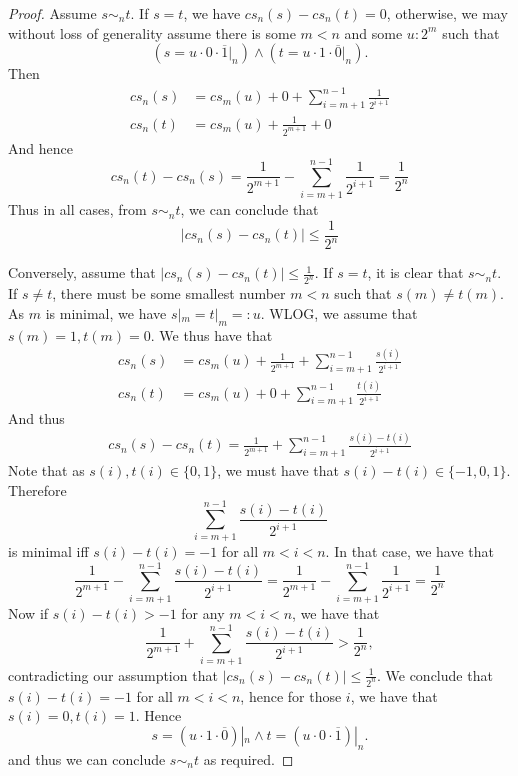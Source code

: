 \begin{proof}
  \item  
    Assume $ s \sim_n t$. If $s=t$, we have $cs_n(s) - cs_n(t) = 0$, 
    otherwise, we may without loss of generality assume there is some $m<n$ and some $u:2^m$ such that 
  \begin{equation}
    (s = u \cdot 0 \cdot \overline 1|_n) \wedge ( t = u \cdot 1 \cdot \overline 0 |_n) . 
  \end{equation}
  Then 
  \begin{align}
    cs_n(s) &= 
    cs_m(u) + 0 + \sum\limits_{i = m+1}^{n-1} \frac{1}{2^{i+1}}\\
    cs_n(t) &= 
    cs_m(u) + \frac{1}{2^{m+1}} + 0  
  \end{align}
  And hence 
  \begin{equation}
    cs_n(t) - cs_n(s) = \frac{1}{2^{m+1}} - \sum\limits_{i = m+1}^{n-1} \frac{1}{2^{i+1}} = \frac{1}{2^n}
  \end{equation}
  Thus in all cases, from $s\sim_n t$, we can conclude that 
  \begin{equation}
    |cs_n(s) -cs_n(t) |\leq \frac{1}{2^n}
  \end{equation}
  \item 
  Conversely, assume that $|cs_n(s) - cs_n(t)| \leq \frac{1}{2^n}$. 
  If $s = t$, it is clear that $s \sim_n t$.
  If $s\neq t$, there must be some smallest number $m<n$ such that 
  $s(m) \neq t(m)$. As $m$ is minimal, we have $s|_m = t|_m = : u$. 
  WLOG, we assume that $s(m) = 1, t(m) = 0$. 
  We thus have that 
  \begin{align}
    cs_n(s) &= 
    cs_m(u) + \frac1{2^{m+1}} + \sum\limits_{i = m+1}^{n-1} \frac{s(i)}{2^{i+1}}\\
    cs_n(t) &= 
    cs_m(u) + 0  + \sum\limits_{i = m+1}^{n-1} \frac{t(i)}{2^{i+1}}
  \end{align}
  And thus 
  \begin{align}
    cs_n(s)-cs_n(t) = \frac{1}{2^{m+1}} + \sum\limits_{i = m+1}^{n-1} \frac{s(i)-t(i)}{2^{i+1}}
  \end{align}
  Note that as $s(i),t(i) \in \{0,1\}$, we must have that $s(i) -t(i) \in \{-1,0,1\}$. 
  Therefore 
  $$\sum\limits_{i = m+1}^{n-1} \frac{s(i)-t(i)}{2^{i+1}}$$
  is minimal iff $s(i) -t(i) = -1$ for all $m<i<n$. 
  In that case, we have that 
  $$
  \frac{1}{2^{m+1}}-
  \sum\limits_{i = m+1}^{n-1} \frac{s(i)-t(i)}{2^{i+1}}= 
  \frac{1}{2^{m+1}}-
  \sum\limits_{i = m+1}^{n-1} \frac{1}{2^{i+1}}= 
  \frac{1}{2^n}
  $$
  Now if $s(i) -t(i) > -1$ for any $m<i<n$, we have that
    $$
    \frac{1}{2^{m+1}} + \sum\limits_{i = m+1}^{n-1} \frac{s(i)-t(i)}{2^{i+1}}> \frac{1}{2^n},$$
  contradicting our assumption that 
  $|cs_n(s) - cs_n(t)| \leq \frac{1}{2^n}$. 
  We conclude that $s(i) -t(i) = -1$ for all $m<i<n$, hence for those $i$, we have that 
  $s(i) = 0, t(i) = 1$. Hence 
  \begin{equation}
    s = (u \cdot 1\cdot \overline 0) |_n \wedge 
    t = (u \cdot 0\cdot \overline 1) |_n.
  \end{equation}
  and thus we can conclude $s\sim_n t$ as required. 
\end{proof}


